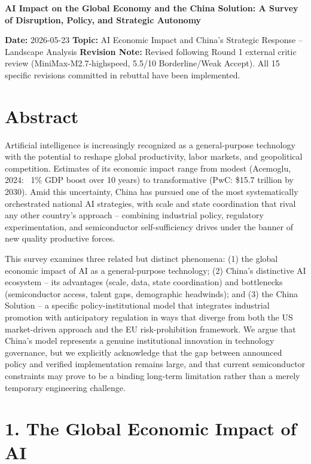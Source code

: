 \documentclass[11pt,a4paper]{article}
\begin{document}
\begin{center}\LARGE\bfseries AI Impact on the Global Economy and the China Solution: A Survey of Disruption, Policy, and Strategic Autonomy\end{center}\vspace{1em}

\textbf{Date:} 2026-05-23
\textbf{Topic:} AI Economic Impact and China's Strategic Response -- Landscape Analysis
\textbf{Revision Note:} Revised following Round 1 external critic review (MiniMax-M2.7-highspeed, 5.5/10 Borderline/Weak Accept). All 15 specific revisions committed in rebuttal have been implemented.


\section{Abstract}

Artificial intelligence is increasingly recognized as a general-purpose technology with the potential to reshape global productivity, labor markets, and geopolitical competition. Estimates of its economic impact range from modest (Acemoglu, 2024: ~1\% GDP boost over 10 years) to transformative (PwC: \$15.7 trillion by 2030). Amid this uncertainty, China has pursued one of the most systematically orchestrated national AI strategies, with scale and state coordination that rival any other country's approach -- combining industrial policy, regulatory experimentation, and semiconductor self-sufficiency drives under the banner of new quality productive forces.

This survey examines three related but distinct phenomena: (1) the global economic impact of AI as a general-purpose technology; (2) China's distinctive AI ecosystem -- its advantages (scale, data, state coordination) and bottlenecks (semiconductor access, talent gaps, demographic headwinds); and (3) the China Solution -- a specific policy-institutional model that integrates industrial promotion with anticipatory regulation in ways that diverge from both the US market-driven approach and the EU risk-prohibition framework. We argue that China's model represents a genuine institutional innovation in technology governance, but we explicitly acknowledge that the gap between announced policy and verified implementation remains large, and that current semiconductor constraints may prove to be a binding long-term limitation rather than a merely temporary engineering challenge.


\section{1. The Global Economic Impact of AI}
\end{document}
